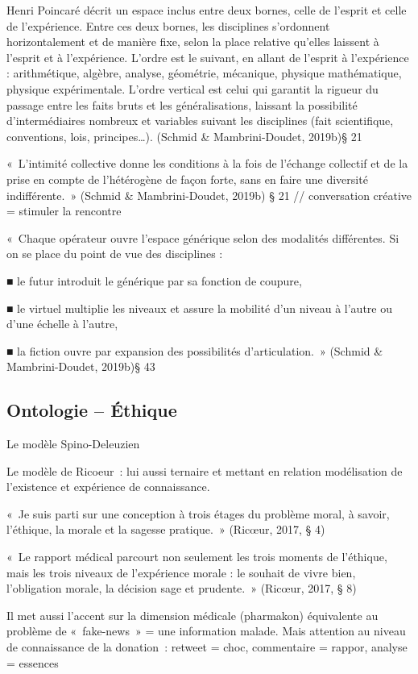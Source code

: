 \documentclass[
  a4paper,
  DIV=11,
  numbers=noendperiod]{scrreprt}
\begin{document}
Henri Poincaré décrit un espace inclus entre deux bornes, celle de
l'esprit et celle de l'expérience. Entre ces deux bornes, les
disciplines s'ordonnent horizontalement et de manière fixe, selon la
place relative qu'elles laissent à l'esprit et à l'expérience. L'ordre
est le suivant, en allant de l'esprit à l'expérience : arithmétique,
algèbre, analyse, géométrie, mécanique, physique mathématique, physique
expérimentale. L'ordre vertical est celui qui garantit la rigueur du
passage entre les faits bruts et les généralisations, laissant la
possibilité d'intermédiaires nombreux et variables suivant les
disciplines (fait scientifique, conventions, lois, principes\ldots).
(Schmid \& Mambrini-Doudet, 2019b)§ 21

«~L'intimité collective donne les conditions à la fois de l'échange
collectif et de la prise en compte de l'hétérogène de façon forte, sans
en faire une diversité indifférente.~» (Schmid \& Mambrini-Doudet,
2019b) § 21 // conversation créative = stimuler la rencontre

«~Chaque opérateur ouvre l'espace générique selon des modalités
différentes. Si on se place du point de vue des disciplines :

■ le futur introduit le générique par sa fonction de coupure,

■ le virtuel multiplie les niveaux et assure la mobilité d'un niveau à
l'autre ou d'une échelle à l'autre,

■ la fiction ouvre par expansion des possibilités d'articulation.~»
(Schmid \& Mambrini-Doudet, 2019b)§ 43

\subsection{Ontologie -- Éthique}\label{ontologie-uxe9thique}

Le modèle Spino-Deleuzien

Le modèle de Ricoeur~: lui aussi ternaire et mettant en relation
modélisation de l'existence et expérience de connaissance.

«~Je suis parti sur une conception à trois étages du problème moral, à
savoir, l'éthique, la morale et la sagesse pratique.~» (Ricœur, 2017, §
4)

«~Le rapport médical parcourt non seulement les trois moments de
l'éthique, mais les trois niveaux de l'expérience morale : le souhait de
vivre bien, l'obligation morale, la décision sage et prudente.~»
(Ricœur, 2017, § 8)

Il met aussi l'accent sur la dimension médicale (pharmakon) équivalente
au problème de «~fake-news~» = une information malade. Mais attention au
niveau de connaissance de la donation~: retweet = choc, commentaire =
rappor, analyse = essences
\end{document}
